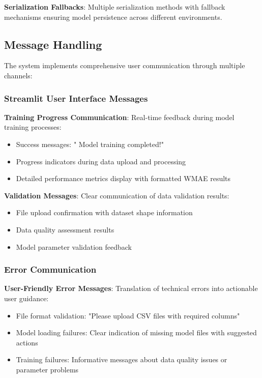 \textbf{Serialization Fallbacks}: Multiple serialization methods with fallback mechanisms ensuring model persistence across different environments.

\subsection{Message Handling}

The system implements comprehensive user communication through multiple channels:

\subsubsection{Streamlit User Interface Messages}

\textbf{Training Progress Communication}: Real-time feedback during model training processes:
\begin{itemize}
	\item Success messages: " Model training completed!"
	\item Progress indicators during data upload and processing
	\item Detailed performance metrics display with formatted WMAE results
\end{itemize}

\textbf{Validation Messages}: Clear communication of data validation results:
\begin{itemize}
	\item File upload confirmation with dataset shape information
	\item Data quality assessment results
	\item Model parameter validation feedback
\end{itemize}

\subsubsection{Error Communication}

\textbf{User-Friendly Error Messages}: Translation of technical errors into actionable user guidance:
\begin{itemize}
	\item File format validation: "Please upload CSV files with required columns"
	\item Model loading failures: Clear indication of missing model files with suggested actions
	\item Training failures: Informative messages about data quality issues or parameter problems
\end{itemize}

